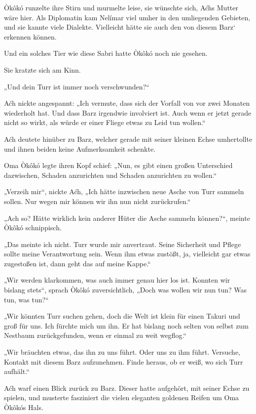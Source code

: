 \trennzeichen



Òkôkó runzelte ihre Stirn und murmelte leise, sie wünschte sich, Aćhs Mutter wäre hier. Als Diplomatin kam Nelímar viel umher in den umliegenden Gebieten, und sie kannte viele Dialekte. Vielleicht hätte sie auch den von diesem Barz‘ erkennen können.

Und ein solches Tier wie diese Sabri hatte Òkôkó noch nie gesehen.

Sie kratzte sich am Kinn.

„Und dein Turr ist immer noch verschwunden?“

Aćh nickte angespannt: „Ich vermute, dass sich der Vorfall von vor zwei Monaten wiederholt hat. Und dass Barz irgendwie involviert ist. Auch wenn er jetzt gerade nicht so wirkt, als würde er einer Fliege etwas zu Leid tun wollen.“

Aćh deutete hinüber zu Barz, welcher gerade mit seiner kleinen Echse umhertollte und ihnen beiden keine Aufmerksamkeit schenkte.

Oma Òkôkó legte ihren Kopf schief: „Nun, es gibt einen großen Unterschied dazwischen, Schaden anzurichten und Schaden anzurichten zu wollen.“

„Verzeih mir“, nickte Aćh, „Ich hätte inzwischen neue Asche von Turr sammeln sollen. Nur wegen mir können wir ihn nun nicht zurückrufen.“

„Ach so? Hätte wirklich kein anderer Hüter die Asche sammeln können?“, meinte Òkôkó schnippisch.

„Das meinte ich nicht. Turr wurde mir anvertraut. Seine Sicherheit und Pflege sollte meine Verantwortung sein. Wenn ihm etwas zustößt, ja, vielleicht gar etwas zugestoßen ist, dann geht das auf meine Kappe.“

„Wir werden klarkommen, was auch immer genau hier los ist. Konnten wir bislang stets“, sprach Òkôkó zuversichtlich, „Doch was wollen wir nun tun? Was tun, was tun?“

„Wir könnten Turr suchen gehen, doch die Welt ist klein für einen Takuri und groß für uns. Ich fürchte mich um ihn. Er hat bislang noch selten von selbst zum Nestbaum zurückgefunden, wenn er einmal zu weit wegflog.“

„Wir bräuchten etwas, das ihn zu uns führt. Oder uns zu ihm führt. Versuche, Kontakt mit diesem Barz aufzunehmen. Finde heraus, ob er weiß, wo sich Turr aufhält.“

Aćh warf einen Blick zurück zu Barz. Dieser hatte aufgehört, mit seiner Echse zu spielen, und musterte fasziniert die vielen eleganten goldenen Reifen um Oma Òkôkós Hals.

